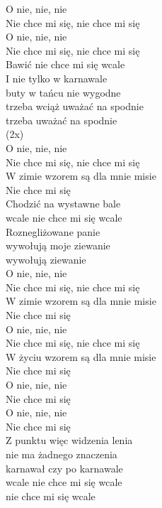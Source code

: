 \begin{text}
\vin O nie, nie, nie\\
\vin Nie chce mi się, nie chce mi się\\
\vin O nie, nie, nie\\
\vin Nie chce mi się, nie chce mi się\\

Bawić nie chce mi się wcale\\
I nie tylko w karnawale\\
buty w tańcu nie wygodne\\
trzeba wciąż uważać na spodnie\\
trzeba uważać na spodnie\\

\vin (2x)\\
\vin O nie, nie, nie\\
\vin Nie chce mi się, nie chce mi się\\
\vin W zimie wzorem są dla mnie misie\\
\vin Nie chce mi się\\

Chodzić na wystawne bale\\
wcale nie chce mi się wcale\\
Roznegliżowane panie\\
wywołują moje ziewanie\\
wywołują ziewanie\\

\vin O nie, nie, nie\\
\vin Nie chce mi się, nie chce mi się\\
\vin W zimie wzorem są dla mnie misie\\
\vin Nie chce mi się\\

\vin O nie, nie, nie\\
\vin Nie chce mi się, nie chce mi się\\
\vin W życiu wzorem są dla mnie misie\\
\vin Nie chce mi się\\

\vin O nie, nie, nie\\
\vin Nie chce mi się\\
\vin O nie, nie, nie\\
\vin Nie chce mi się\\

Z punktu więc widzenia lenia\\
nie ma żadnego znaczenia\\
karnawał czy po karnawale\\
wcale nie chce mi się wcale\\
nie chce mi się wcale\\


\end{text}
